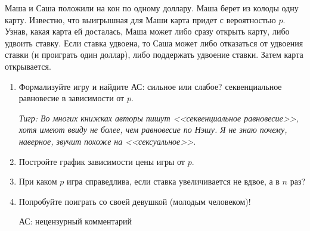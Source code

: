 \begin{problem}
Маша и Саша положили на кон по одному доллару. Маша берет из колоды одну карту. Известно, что выигрышная для Маши карта придет с вероятностью  $p$. Узнав, какая карта ей досталась, Маша может либо сразу открыть карту, либо удвоить ставку. Если ставка удвоена, то Саша может либо отказаться от удвоения ставки (и проиграть один доллар), либо поддержать удвоение ставки. Затем карта открывается.\par
\begin{enumerate}
\item Формализуйте игру и найдите {\red АС: сильное или слабое?} секвенциальное равновесие в зависимости от  $p$. \par
{\it Тигр: Во многих книжках авторы пишут <<секвенциальное равновесие>>, хотя имеют ввиду не более, чем равновесие по Нэшу. Я не знаю почему, наверное, звучит похоже на <<сексуальное>>.}\par
\item Постройте график зависимости цены игры от  $p$.\par
\item  При каком  $p$  игра справедлива, если ставка увеличивается не вдвое, а в  $n$  раз?\par
\item Попробуйте поиграть со своей девушкой (молодым человеком)!\par {\red АС: нецензурный комментарий}
\end{enumerate}


\begin{sol}

\end{sol}
\end{problem}



